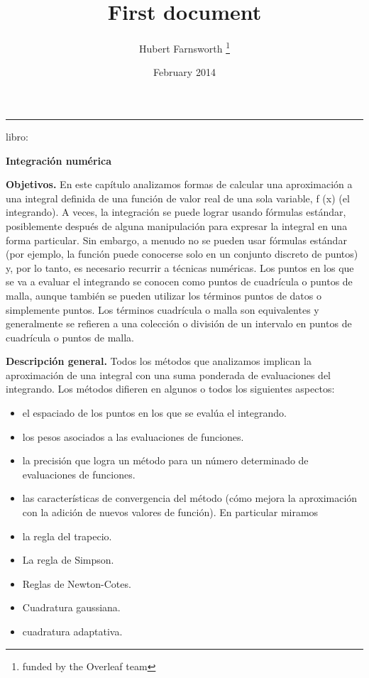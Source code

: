 \documentclass[12pt, letterpaper, twoside]{article}
\title{First document}
\author{Hubert Farnsworth \thanks{funded by the Overleaf team}}
\date{February 2014}
\begin{document}
\begin{titlepage}
\maketitle
\end{titlepage}


\hrule

\hfill


libro: \cite{Woodford}

\hfill

\textbf{Integración numérica}

\hfill

\textbf{Objetivos.} En este capítulo analizamos formas de calcular una aproximación a una integral definida de una función de valor real de una sola variable, f (x) (el integrando). A veces, la integración se puede lograr usando fórmulas estándar, posiblemente después de alguna manipulación para expresar la integral en una forma particular. Sin embargo, a menudo no se pueden usar fórmulas estándar (por ejemplo, la función puede conocerse solo en un conjunto discreto de puntos) y, por lo tanto, es necesario recurrir a técnicas numéricas. Los puntos en los que se va a evaluar el integrando se conocen como puntos de cuadrícula o puntos de malla, aunque también se pueden utilizar los términos puntos de datos o simplemente puntos. Los términos cuadrícula o malla son equivalentes y generalmente se refieren a una colección o división de un intervalo en puntos de cuadrícula o puntos de malla.


\hfill

\textbf{Descripción general.} Todos los métodos que analizamos implican la aproximación de una integral con una suma ponderada de evaluaciones del integrando. Los métodos difieren en algunos o todos los siguientes aspectos:

\begin{itemize}
\item el espaciado de los puntos en los que se evalúa el integrando.
\item los pesos asociados a las evaluaciones de funciones.
\item la precisión que logra un método para un número determinado de evaluaciones de funciones.
\item las características de convergencia del método (cómo mejora la aproximación con la adición de nuevos valores de función). En particular miramos
\item la regla del trapecio.
\item La regla de Simpson.
\item Reglas de Newton-Cotes.
\item Cuadratura gaussiana.
\item cuadratura adaptativa.
\end{itemize}
\end{document}

